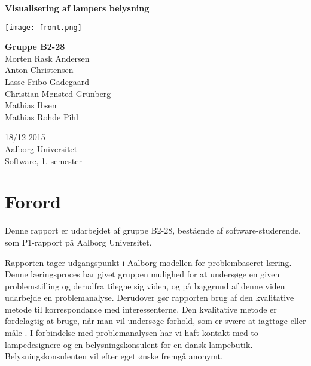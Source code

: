 \begin{titlepage}
  \vspace{0.2cm}
  \begin{center}
    \Huge{\textbf{Visualisering af lampers belysning}}
  \end{center}
  \vspace{0.2cm}
  \vfill
  \begin{center}
  \texttt{[image: front.png]}
  \end{center}
  \begin{center}
    \Large{\textbf{Gruppe B2-28}}\\
	Morten Rask Andersen\\
	Anton Christensen\\
	Lasse Fribo Gadegaard\\
	Christian Mønsted Grünberg\\
	Mathias Ibsen\\
	Mathias Rohde Pihl
  \end{center}
  \begin{center}
 	18/12-2015\\
    Aalborg Universitet\\
    Software, 1. semester
  \end{center}
\end{titlepage}

\mbox{}
\thispagestyle{empty}
\newpage


\addtocounter{page}{-2}
\clearpage



\clearpage


\section{Forord}
Denne rapport er udarbejdet af gruppe B2-28, bestående af software-studerende, som P1-rapport på Aalborg Universitet.

Rapporten tager udgangspunkt i Aalborg-modellen for problembaseret læring. Denne læringsproces har givet gruppen mulighed for at undersøge en given problemstilling og derudfra tilegne sig viden, og på baggrund af denne viden udarbejde en problemanalyse. Derudover gør rapporten brug af den kvalitative metode til korrespondance med interessenterne. Den kvalitative metode er fordelagtig at bruge, når man vil undersøge forhold, som er svære at iagttage eller måle \cite{kvalitativ_metode}. I forbindelse med problemanalysen har vi haft kontakt med to lampedesignere og en belysningskonsulent for en dansk lampebutik. Belysningskonsulenten vil efter eget ønske fremgå anonymt. 

